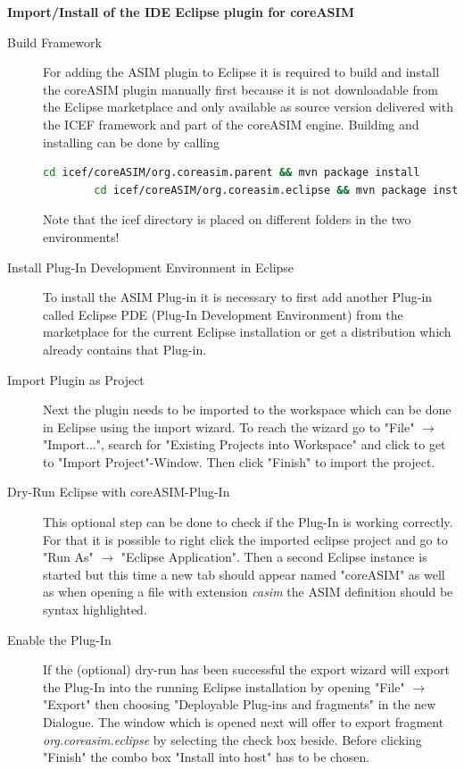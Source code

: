 \textbf{Import/Install of the IDE Eclipse plugin for coreASIM}
\begin{description}
	\item[Build Framework] For adding the ASIM plugin to Eclipse it is required to build and install the coreASIM plugin manually first because it is not downloadable from the Eclipse marketplace and only available as source version delivered with the ICEF framework and part of the coreASIM engine. Building and installing can be done by calling
	\begin{lstlisting}[language=bash]
		cd icef/coreASIM/org.coreasim.parent && mvn package install
		cd icef/coreASIM/org.coreasim.eclipse && mvn package install\end{lstlisting}
	Note that the icef directory is placed on different folders in the two environments!
	
	\item[Install Plug-In Development Environment in Eclipse] To install the ASIM Plug-in it is necessary to first add another Plug-in called Eclipse PDE (Plug-In Development Environment) from the marketplace for the current Eclipse installation or get a distribution which already contains that Plug-in.
	
	\item[Import Plugin as Project] Next the plugin needs to be imported to the workspace which can be done in Eclipse using the import wizard. To reach the wizard go to "File" $\rightarrow$ "Import...", search for "Existing Projects into Workspace" and click to get to "Import Project"-Window. Then click "Finish" to import the project.
	
	\item[Dry-Run Eclipse with coreASIM-Plug-In] This optional step can be done to check if the Plug-In is working correctly. For that it is possible to right click the imported eclipse project and go to "Run As" $\rightarrow$ "Eclipse Application". Then a second Eclipse instance is started but this time a new tab should appear named "coreASIM" as well as when opening a file with extension \textit{casim} the ASIM definition should be syntax highlighted.

	\item[Enable the Plug-In] If the (optional) dry-run has been successful the export wizard will export the Plug-In into the running Eclipse installation by opening "File" $\rightarrow$  "Export" then choosing "Deployable Plug-ins and fragments" in the new Dialogue. The window which is opened next will offer to export fragment  \textit{org.coreasim.eclipse} by selecting the check box beside. Before clicking "Finish" the combo box "Install into host" has to be chosen.
	
\end{description}

